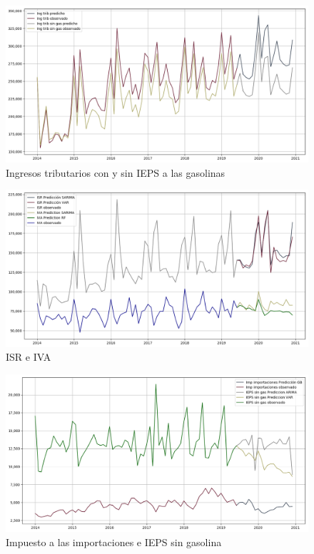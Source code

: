 \documentclass[a4paper, 11pt]{article}
\begin{document}
\begin{figure}[hbt!]
    \centering
     \caption{Ingresos tributarios con y sin IEPS a las gasolinas}
     \label{fig:pred_ing_trib}
     \includegraphics[scale = 0.5]{figures/pred_ing_trib}
\end{figure}

\begin{figure}[hbt!]
    \centering
     \caption{ISR e IVA}
     \label{fig:pred_isr_iva}
     \includegraphics[scale = 0.5]{figures/pred_isr_iva}
\end{figure}

\begin{figure}[hbt!]
    \centering
     \caption{Impuesto a las importaciones e IEPS sin gasolina}
     \label{fig:pred_imp_ieps}
     \includegraphics[scale = 0.5]{figures/pred_imp_ieps}
\end{figure}
\end{document}

